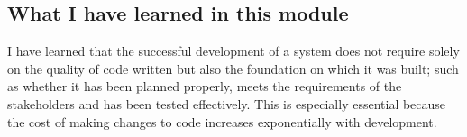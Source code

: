 

\subsection{What I have learned in this module}
I have learned that the successful development of a system does not require solely on the quality of code written but also the foundation on which it was built; such as whether it has been planned properly, meets the requirements of the stakeholders and has been tested effectively. This is especially essential because the cost of making changes to code increases exponentially with development.

